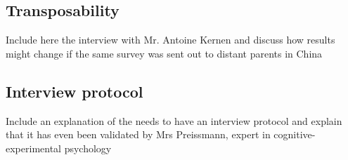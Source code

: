 \subsection{Transposability}
\label{transposability}

Include here the interview with Mr. Antoine Kernen and %
discuss how results might change if the same survey was sent out to distant parents in China


\subsection{Interview protocol}
\label{interview-protocol}

Include an explanation of the needs to have an interview protocol and explain that it has even been validated by Mrs Preissmann, expert in cognitive-experimental psychology

